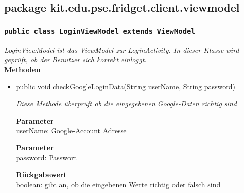 		\subsection{package kit.edu.pse.fridget.client.viewmodel}
		\subsubsection{\texttt{public class LoginViewModel extends ViewModel}}
        \textit{LoginViewModel ist das ViewModel zur LoginActivity. In dieser Klasse wird geprüft, ob der Benutzer sich korrekt einloggt.}\\
        
		\textbf{Methoden} \\
 			\begin{itemize}
        		\item{public void checkGoogleLoginData(String userName, String password)}
        	
        		\textit{Diese Methode überprüft ob die eingegebenen Google-Daten richtig sind}
        	
        		\textbf{Parameter} \\
				userName: Google-Account Adresse

				\textbf{Parameter} \\
				password: Passwort

				\textbf{Rückgabewert} \\
				boolean: gibt an, ob die eingebenen Werte richtig oder falsch sind
   
       		 \end{itemize}
             
